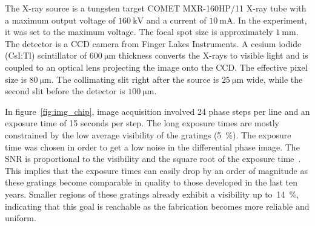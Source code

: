 The X-ray source is a tungsten target COMET MXR-160HP/11 X-ray tube with a maximum output
voltage of $\SI{160}{\kilo\volt}$ and a current of $\SI{10}{\milli\ampere}$. In the experiment, it was set to the
maximum voltage. The focal spot size is approximately
$\SI{1}{\milli\metre}$. The detector is a CCD camera from Finger Lakes
Instruments. A cesium iodide (CsI:Tl) scintillator of $\SI{600}{\micro
\metre}$ thickness converts the X-rays to visible light and is coupled to
an optical lens projecting the image onto the CCD\@. The effective pixel size
is $\SI{80}{\micro\metre}$. The collimating slit right after the source is 
$\SI{25}{\micro\metre}$ wide, while the second slit before the detector is
$\SI{100}{\micro\metre}$.

In figure~\ref{fig:img_chip}, image acquisition involved 24 phase steps per
line and an exposure time of 15 seconds per step. The long
exposure times are mostly constrained by the low average visibility of the
gratings (\SI{5}{\percent}). The exposure time was chosen in order to
get a low noise in the differential phase image. The \ac{SNR} is
proportional to the visibility and the square root of the exposure
time~\parencite{Raupach2011}.
This implies that the exposure times can easily drop by an order of
magnitude as these gratings become comparable in quality to those developed
in the last ten years. 
Smaller regions of these gratings already exhibit a visibility up
to~\SI{14}{\percent}, indicating that this goal is reachable as the
fabrication becomes more reliable and uniform.
